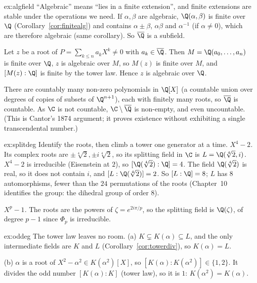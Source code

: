 \begin{solution}{ex:algfield}
\idea ``Algebraic'' means ``lies in a finite extension'', and finite extensions are stable under the operations we need.
\writeup If $\alpha,\beta$ are algebraic, $\Q(\alpha,\beta)$ is finite over $\Q$ (Corollary~\ref{cor:finitealg}) and contains $\alpha\pm\beta$, $\alpha\beta$ and $\alpha^{-1}$ (if $\alpha\ne0$), which are therefore algebraic (same corollary). So $\overline{\Q}$ is a subfield.

Let $z$ be a root of $P=\sum_{k\le n}a_kX^k\ne0$ with $a_k\in\overline{\Q}$. Then $M=\Q(a_0,\dots,a_n)$ is finite over $\Q$, $z$ is algebraic over $M$, so $M(z)$ is finite over $M$, and $[M(z):\Q]$ is finite by the tower law. Hence $z$ is algebraic over $\Q$.

There are countably many non-zero polynomials in $\Q[X]$ (a countable union over degrees of copies of subsets of $\Q^{n+1}$), each with finitely many roots, so $\overline{\Q}$ is countable. As $\C$ is not countable, $\C\setminus\overline{\Q}$ is non-empty, and even uncountable. (This is Cantor's 1874 argument; it proves existence without exhibiting a single transcendental number.)
\end{solution}

\begin{solution}{ex:splitdeg}
\idea Identify the roots, then climb a tower one generator at a time.
\writeup \emph{$X^4-2$.} Its complex roots are $\pm\sqrt[4]2,\pm i\sqrt[4]2$, so its splitting field in $\C$ is $L=\Q(\sqrt[4]2,i)$. $X^4-2$ is irreducible (Eisenstein at $2$), so $[\Q(\sqrt[4]2):\Q]=4$. The field $\Q(\sqrt[4]2)$ is real, so it does not contain $i$, and $[L:\Q(\sqrt[4]2)]=2$. So $[L:\Q]=8$; $L$ has $8$ automorphisms, fewer than the $24$ permutations of the roots (Chapter~10 identifies the group: the dihedral group of order $8$).

\emph{$X^p-1$.} The roots are the powers of $\zeta=e^{2i\pi/p}$, so the splitting field is $\Q(\zeta)$, of degree $p-1$ since $\Phi_p$ is irreducible.
\end{solution}

\begin{solution}{ex:oddeg}
\idea The tower law leaves no room.
\writeup (a) $K\subsetneq K(\alpha)\subseteq L$, and the only intermediate fields are $K$ and $L$ (Corollary~\ref{cor:towerdiv}), so $K(\alpha)=L$.

(b) $\alpha$ is a root of $X^2-\alpha^2\in K(\alpha^2)[X]$, so $[K(\alpha):K(\alpha^2)]\in\{1,2\}$. It divides the odd number $[K(\alpha):K]$ (tower law), so it is $1$: $K(\alpha^2)=K(\alpha)$.
\end{solution}

